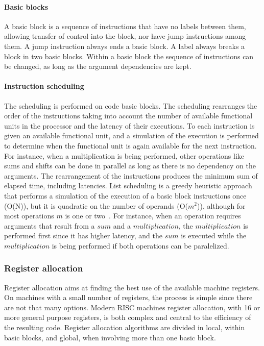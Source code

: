 \paragraph{Basic blocks}

A basic block is a sequence of instructions that have no labels between them,
allowing transfer of control into the block, nor have jump instructions among
them.  A jump instruction always ends a basic block.  A label always breaks a
block in two basic blocks.  Within a basic block the sequence of instructions
can be changed, as long as the argument dependencies are kept.


\paragraph{Instruction scheduling}

The scheduling is performed on code basic blocks.  The scheduling rearranges the
order of the instructions taking into account the number of available functional
units in the processor and the latency of their executions.  To each instruction
is given an available functional unit, and a simulation of the execution is
performed to determine when the functional unit is again available for the next
instruction.  For instance, when a multiplication is being performed, other
operations like sums and shifts can be done in parallel as long as there is no
dependency on the arguments.  The rearrangement of the instructions produces the
minimum sum of elapsed time, including latencies.
List scheduling is a greedy heuristic approach that performs a simulation of the
execution of a basic block instructions once (O(N)), but it is quadratic on the
number of operands (O($m^2$)), although for most operations $m$ is one or
two~\cite[p.605]{cooper03}.
For instance, when an operation requires arguments that result from a $sum$ and a $multiplication$, the $multiplication$ is performed first since it has higher latency, and the $sum$ is executed while the $multiplication$ is being performed if both operations can be paralelized.

\subsubsection{Register allocation}

Register allocation aims at finding the best use of the available machine
registers.  On machines with a small number of registers, the process is simple
since there are not that many options.  Modern {\sc RISC} machines register 
allocation, with 16 or more general purpose registers,  is both complex and central
to the efficiency of the resulting code.  Register allocation algorithms are
divided in local, within basic blocks, and global, when involving more than one
basic block.

